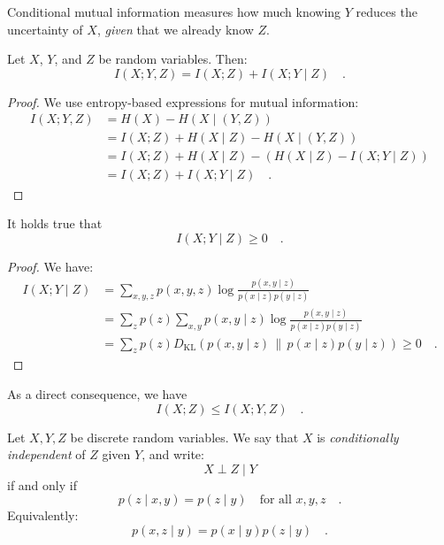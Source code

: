 \documentclass[../../main.tex]{subfiles}
\begin{document}
\begin{remark}
    Conditional mutual information measures how much knowing \( Y \) reduces the uncertainty of \( X \), \emph{given} that we already know \( Z \).
\end{remark}

\begin{proposition}
    Let \( X \), \( Y \), and \( Z \) be random variables. Then:
    \[
        I(X; Y, Z) = I(X; Z) + I(X; Y \mid Z) \quad .
    \]
\end{proposition}
\begin{proof}
    We use entropy-based expressions for mutual information:
    \begin{align*}
        I(X; Y, Z) &= H(X) - H(X \mid (Y, Z)) \\
        &= I(X; Z) + H(X \mid Z) - H(X \mid (Y, Z)) \\
        &= I(X; Z) + H(X \mid Z) - (H(X \mid Z) - I(X; Y \mid Z)) \\
        &= I(X; Z) + I(X; Y \mid Z) \quad .
    \end{align*}
\end{proof}

\begin{proposition}
    It holds true that
    \[
        I(X; Y \mid Z) \geq 0 \quad .
    \]
\end{proposition}
\vspace{-2.5em}
\begin{proof}
    We have:
    \begin{align*}
        I(X; Y \mid Z) &= \sum_{x, y, z} p(x, y, z) \log \frac{p(x, y \mid z)}{p(x \mid z) p(y \mid z)} \\
        &= \sum_{z} p(z) \sum_{x, y} p(x, y \mid z) \log \frac{p(x, y \mid z)}{p(x \mid z) p(y \mid z)} \\
        &= \sum_{z} p(z) D_{\mathrm{KL}} \left( p(x, y \mid z) \, \| \, p(x \mid z) p(y \mid z) \right) \geq 0 \quad .
    \end{align*}
\end{proof}

\begin{corollary}
    As a direct consequence, we have
    \[
        I(X; Z) \leq I(X; Y, Z) \quad .
    \]
\end{corollary}

\begin{definition}
    Let \( X, Y, Z \) be discrete random variables. We say that \( X \) is \emph{conditionally independent} of \( Z \) given \( Y \), and write:
    \[
        X \perp Z \mid Y
    \]
    if and only if
    \[
        p(z \mid x, y) = p(z \mid y) \quad \text{for all } x, y, z \quad .
    \]
    Equivalently:
    \[
        p(x, z \mid y) = p(x \mid y) p(z \mid y) \quad .
    \]
\end{definition}
\end{document}
